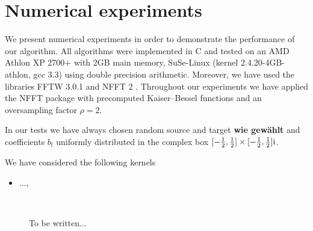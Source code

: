 \documentclass[11pt,a4paper,twoside,bibtotoc]{scrartcl}
\theoremstyle{plain}
\theoremstyle{definition}
\theoremstyle{remark}
\numberwithin{equation}{section}
\numberwithin{table}{section}
\numberwithin{figure}{section}
\begin{document}
\section{Numerical experiments}

We present numerical experiments in order to demonstrate the performance of
our algorithm.
All algorithms were implemented in C and tested on an AMD Athlon\texttrademark
XP 2700+ with 2GB main memory, SuSe-Linux (kernel 2.4.20-4GB-athlon, gcc 3.3)
using double precision arithmetic. 
Moreover, we have used the libraries FFTW 3.0.1 \cite{fftw} and NFFT 2
\cite{kupo02C}. 
Throughout our experiments we have applied the NFFT package \cite{kupo02C}
with precomputed Kaiser--Bessel functions and an oversampling factor $\rho=2$.

In our tests we have always chosen random source and target {\bf wie gewählt}
and coefficients $b_l$ uniformly distributed in the complex box
$[-\frac{1}{2},\frac{1}{2}]\times [-\frac{1}{2},\frac{1}{2}]{\rm i}$.

We have considered the following kernels

\begin{itemize}
\item ...,
\end{itemize}

\begin{figure}[tb]
  \centering
  \hfill
  \\
  \caption{To be written...}
  \label{Figure:PoissonTest}
\end{figure}
\end{document}
